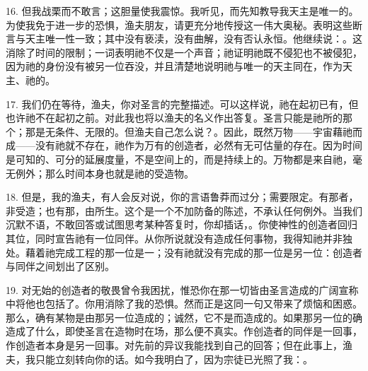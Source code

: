 16. 但我战栗而不敢言；这胆量使我震惊。我听见，而先知教导我天主是唯一的。为使我免于进一步的恐惧，渔夫朋友，请更充分地传授这一伟大奥秘。表明这些断言与天主唯一性一致；其中没有亵渎，没有曲解，没有否认永恒。他继续说：。这消除了时间的限制；一词表明祂不仅是一个声音；祂证明祂既不侵犯也不被侵犯，因为祂的身份没有被另一位吞没，并且清楚地说明祂与唯一的天主同在，作为天主、祂的。\par

17. 我们仍在等待，渔夫，你对圣言的完整描述。可以这样说，祂在起初已有，但也许祂不在起初之前。对此我也将以渔夫的名义作出答复。圣言只能是祂所的那个；那是无条件、无限的。但渔夫自己怎么说？。因此，既然万物——宇宙藉祂而成——没有祂就不存在，祂作为万有的创造者，必然有无可估量的存在。因为时间是可知的、可分的延展度量，不是空间上的，而是持续上的。万物都是来自祂，毫无例外；那么时间本身也就是祂的受造物。\par

18. 但是，我的渔夫，有人会反对说，你的言语鲁莽而过分；需要限定。有那者，非受造；也有那，由所生。这个是一个不加防备的陈述，不承认任何例外。当我们沉默不语，不敢回答或试图思考某种答复时，你却插话，。你使神性的创造者回归其位，同时宣告祂有一位同伴。从你所说就没有造成任何事物，我得知祂并非独处。藉着祂完成工程的那一位是一；没有祂就没有完成的那一位是另一位：创造者与同伴之间划出了区别。\par

19. 对无始的创造者的敬畏曾令我困扰，惟恐你在那一切皆由圣言造成的广阔宣称中将他也包括了。你用消除了我的恐惧。然而正是这同一句又带来了烦恼和困惑。那么，确有某物是由那另一位造成的；诚然，它不是而造成的。如果那另一位的确造成了什么，即使圣言在造物时在场，那么便不真实。作创造者的同伴是一回事，作创造者本身是另一回事。对先前的异议我能找到自己的回答；但在此事上，渔夫，我只能立刻转向你的话。如今我明白了，因为宗徒已光照了我：。\par

